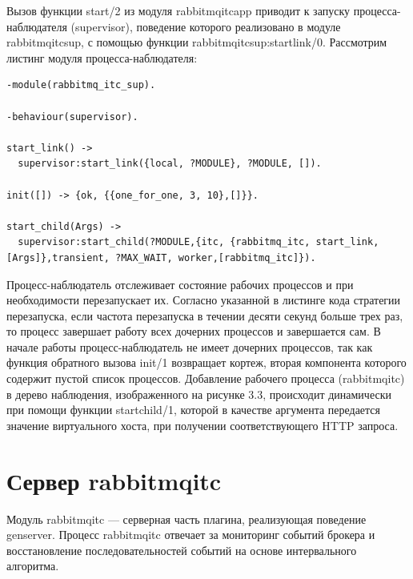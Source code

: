 Вызов функции start/2 из модуля rabbitmq\underline{\hspace{0.25cm}}itc\underline{\hspace{0.25cm}}app приводит к запуску процесса-наблюдателя (supervisor), поведение которого реализовано в модуле rabbitmq\underline{\hspace{0.25cm}}itc\underline{\hspace{0.25cm}}sup, с помощью функции rabbitmq\underline{\hspace{0.25cm}}itc\underline{\hspace{0.25cm}}sup:start\underline{\hspace{0.25cm}}link/0. Рассмотрим листинг модуля процесса-наблюдателя:
\begin{lstlisting}
-module(rabbitmq_itc_sup).

-behaviour(supervisor).

start_link() -> 
  supervisor:start_link({local, ?MODULE}, ?MODULE, []).

init([]) -> {ok, {{one_for_one, 3, 10},[]}}.

start_child(Args) ->
  supervisor:start_child(?MODULE,{itc, {rabbitmq_itc, start_link, [Args]},transient, ?MAX_WAIT, worker,[rabbitmq_itc]}).
\end{lstlisting}
Процесс-наблюдатель отслеживает состояние рабочих процессов и при необходимости перезапускает их. Согласно указанной в листинге кода стратегии перезапуска, если частота перезапуска в течении десяти секунд больше трех раз, то процесс завершает работу всех дочерних процессов и завершается сам. В начале работы процесс-наблюдатель не имеет дочерних процессов, так как функция обратного вызова init/1 возвращает кортеж, вторая компонента которого содержит пустой список процессов. Добавление рабочего процесса (rabbitmq\underline{\hspace{0.25cm}}itc) в дерево наблюдения, изображенного на рисунке 3.3, происходит динамически при помощи функции  start\underline{\hspace{0.25cm}}child/1, которой в качестве аргумента передается значение виртуального хоста, при получении соответствующего HTTP запроса.

\section{Сервер rabbitmq\underline{\hspace{0.25cm}}itc}
Модуль rabbitmq\underline{\hspace{0.25cm}}itc --- серверная часть плагина, реализующая поведение gen\underline{\hspace{0.25cm}}server. Процесс rabbitmq\underline{\hspace{0.25cm}}itc отвечает за мониторинг событий брокера и восстановление последовательностей событий на основе интервального алгоритма.

